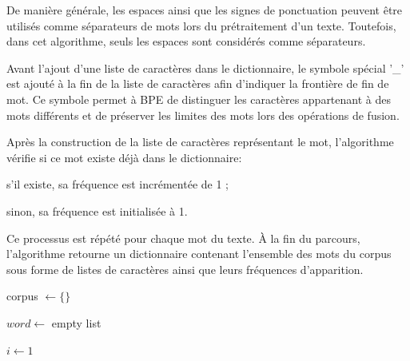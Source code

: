 \documentclass[12pt,a4paper]{report}
\begin{document}
De manière générale, les espaces ainsi que les signes de ponctuation peuvent être utilisés comme séparateurs de mots lors du prétraitement d'un texte. Toutefois, dans cet algorithme, seuls les espaces sont considérés comme séparateurs.

Avant l’ajout d’une liste de caractères dans le dictionnaire, le symbole spécial '\_' est ajouté à la fin de la liste de caractères afin d’indiquer la frontière de fin de mot. Ce symbole permet à BPE de distinguer les caractères appartenant à des mots différents et de préserver les limites des mots lors des opérations de fusion.

Après la construction de la liste de caractères représentant le mot, l’algorithme vérifie si ce mot existe déjà dans le dictionnaire:

\begin{itemizeFB}
	\item s’il existe, sa fréquence est incrémentée de 1 ;
	\item sinon, sa fréquence est initialisée à 1.
\end{itemizeFB}

Ce processus est répété pour chaque mot du texte. À la fin du parcours, l’algorithme retourne un dictionnaire contenant l’ensemble des mots du corpus sous forme de listes de caractères ainsi que leurs fréquences d’apparition.

\begin{algorithm}[H]
	\caption{ComputeWordsFrequencies}
	
	corpus $\leftarrow \{\}$\;
	
	$word \leftarrow$ empty list\;
	
	$i \leftarrow 1$\;
	
	
	
	
\end{algorithm}
\end{document}
